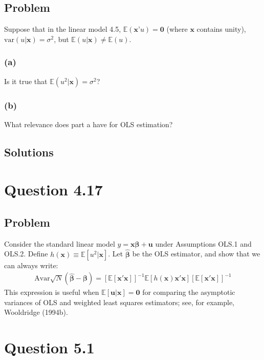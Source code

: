 \documentclass[10pt, a4paper]{article}
\newcommand{\EE}{\mathbb E}
\newcommand{\var}{\text{var}}
\begin{document}
  \subsection*{Problem}
    Suppose that in the linear model 4.5, $\EE(\textbf{x'}u)=\textbf{0}$ (where $\textbf{x}$ contains unity), $\var(u|\textbf{x})=\sigma^2$, but $\EE(u|\textbf{x})\ne\EE(u)$. 
    \subsubsection*{(a)}
      Is it true that $\EE(u^2|\textbf{x}) = \sigma^2$?
    \subsubsection*{(b)}
      What relevance does part a have for OLS estimation?
  \subsection*{Solutions}
\section*{Question 4.17}
  \subsection*{Problem}
    Consider the standard linear model $y = \boldsymbol{x}\boldsymbol{\beta} + \boldsymbol{u}$ under Assumptions OLS.1 and OLS.2. Define $h(\boldsymbol{x}) \equiv \mathbb{E}[u^2 | \boldsymbol{x}]$. Let $\hat{\boldsymbol{\beta}}$ be the OLS estimator, and show that we can always write:
    \begin{align}
    \text{Avar}\sqrt{N}(\hat{\boldsymbol{\beta}} - \boldsymbol{\beta}) = \left[\mathbb{E}[\boldsymbol{x}'\boldsymbol{x}]\right]^{-1} \mathbb{E}[h(\boldsymbol{x})\boldsymbol{x}'\boldsymbol{x}]\left[\mathbb{E}[\boldsymbol{x}'\boldsymbol{x}]\right]^{-1}
    \end{align}
    This expression is useful when $\mathbb{E}[\boldsymbol{u} | \boldsymbol{x}] = \boldsymbol{0}$ for comparing the asymptotic variances of OLS and weighted least squares estimators; see, for example, Wooldridge (1994b).
\section*{Question 5.1}
\end{document}
